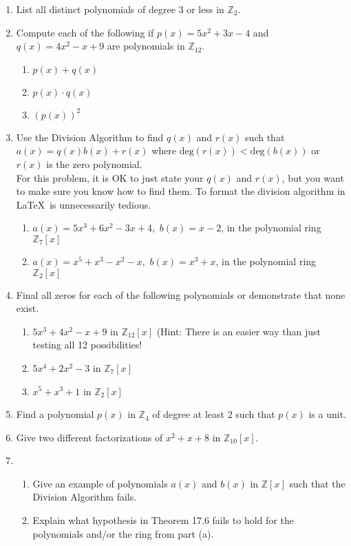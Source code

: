 \documentclass[12pt]{article}
\newcommand{\bbZ}{\mathbb{Z}}
\begin{document}
\begin{enumerate}
\item List all distinct polynomials of degree 3 or less in $\bbZ_2.$\\

\item Compute each of the following if $p(x)=5x^2+3x-4$ and $q(x)=4x^2-x+9$ are polynomials in $\bbZ_{12}.$\\
	\begin{enumerate}
	\item $p(x)+q(x)$
	\item $p(x)\cdot q(x)$
	\item $(p(x))^2$
	\end{enumerate}
\item Use the Division Algorithm to find $q(x)$ and $r(x)$ such that $a(x)=q(x)b(x)+r(x)$ where $\text{deg}(r(x)) < \text{deg}(b(x))$ or $r(x)$ is the zero polynomial.\\
For this problem, it is OK to just state your $q(x)$ and $r(x)$, but you want to make sure you know how to find them. To format the division algorithm in \LaTeX \, is unnecessarily tedious. 
	\begin{enumerate}
	\item $a(x)= 5x^3+6x^2-3x+4,$ $b(x)=x-2$,  in the polynomial ring $\bbZ_7[x]$\\
	\item $a(x)= x^5+x^3-x^2-x,$ $b(x)=x^3+x$,  in the polynomial ring $\bbZ_2[x]$\\
	\end{enumerate}
\item Final all zeros for each of the following polynomials or demonstrate that none exist.\\
	\begin{enumerate}
	\item $5x^3+4x^2-x+9$ in $\bbZ_{12}[x]$ (Hint: There is an easier way than just testing all 12 possibilities!\\
	\item $5x^4+2x^2-3$ in $\bbZ_7[x]$\\
	\item $x^5+x^3+1$ in $\bbZ_2[x]$\\
	\end{enumerate}
	
\item Find a polynomial $p(x)$ in $\bbZ_4$ of degree at least 2 such that $p(x)$ is a unit.\\

\item Give two different factorizations of $x^2+x+8$ in $\bbZ_{10}[x].$\\

\item 
	\begin{enumerate}
	\item Give an example of polynomials $a(x)$ and $b(x)$ in $\bbZ[x]$ such that the Division Algorithm fails.\\
	\item Explain what hypothesis in Theorem 17.6 fails to hold for the polynomials and/or the ring from part (a).\\
	\end{enumerate} 
\end{enumerate}
\end{document}
